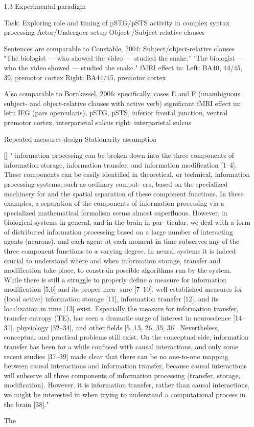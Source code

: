 1.3 Experimental paradigm

Task: Exploring role and timing of pSTG/pSTS activity in complex syntax processing
Actor/Undergoer setup
Object-/Subject-relative clauses

Sentences are comparable to Constable, 2004:
Subject/object-relative clauses
"The biologist — who showed the video — studied the snake."
"The biologist — who the video showed — studied the snake."
fMRI effect in:
Left: BA40, 44/45, 39, premotor cortex
Right: BA44/45, premotor cortex

Also comparable to Bornkessel, 2006:
specifically, cases E and F (unambiguous subject- and object-relative clauses with active verb)
significant fMRI effect in:
left: IFG (pars opercularis), pSTG, pSTS, inferior frontal junction, ventral premotor cortex, interparietal sulcus
right: interparietal sulcus

Repeated-measures design
Stationarity assumption

[]
" information processing can be broken down into the three components of
 information storage, information transfer, and information modification [1–4]. These components can be
 easily identified in theoretical, or technical, information processing systems, such as ordinary comput-
 ers, based on the specialized machinery for and the spatial separation of these component functions. In
 these examples, a separation of the components of information processing via a specialized mathematical
 formalism seems almost superfluous. However, in biological systems in general, and in the brain in par-
 ticular, we deal with a form of distributed information processing based on a large number of interacting
 agents (neurons), and each agent at each moment in time subserves any of the three component functions
 to a varying degree. In neural systems it is indeed crucial to understand where and when information
 storage, transfer and modification take place, to constrain possible algorithms run by the system. While
 there is still a struggle to properly define a measure for information modification [5,6] and its proper mea-
 sure [7–10], well established measures for (local active) information storage [11], information transfer [12],
 and its localization in time [13] exist.
 Especially the measure for information transfer, transfer entropy (TE), has seen a dramatic surge
 of interest in neuroscience [14–31], physiology [32–34], and other fields [5, 13, 26, 35, 36]. Nevertheless,
 conceptual and practical problems still exist. On the conceptual side, information transfer has been for a
 while confused with causal interactions, and only some recent studies [37–39] made clear that there can be
 no one-to-one mapping between causal interactions and information transfer, because causal interactions
 will subserve all three components of information processing (transfer, storage, modification). However,
 it is information transfer, rather than causal interactions, we might be interested in when trying to
 understand a computational process in the brain [38]."

The 